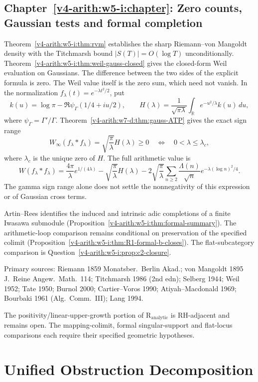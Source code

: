 \subsection{Chapter~\ref{v4-arith:w5-i:chapter}: Zero counts, Gaussian tests and formal completion}
\label{v4-arith:w5-synth:ch59}

Theorem~\ref{v4-arith:w5-i:thm:rvm} establishes
the sharp Riemann--von Mangoldt density with the Titchmarsh bound
\(|S(T)|=O(\log T)\) unconditionally.
Theorem~\ref{v4-arith:w5-i:thm:weil-gauss-closed}
gives the closed-form Weil evaluation on Gaussians.
The difference between the two sides of the explicit formula is zero.
The Weil value itself is the zero sum, which need not vanish.
In the normalization \(f_\lambda(t)=e^{-\lambda t^2/2}\), put
\[
 k(u)=\log\pi-\Re\psi_\Gamma(1/4+iu/2),\qquad
 H(\lambda)=\frac1{\sqrt{\pi\lambda}}
             \int_{\mathbb R}e^{-u^2/\lambda}k(u)\,du,
\]
where \(\psi_\Gamma=\Gamma'/\Gamma\).
Theorem~\ref{v4-arith:w7-d:thm:gauss-ATP} gives the exact sign range
\[
 W_\infty(f_\lambda*f_\lambda)
 =\sqrt{\frac\pi\lambda}H(\lambda)\ge0
 \quad\Longleftrightarrow\quad 0<\lambda\le\lambda_c,
\]
where \(\lambda_c\) is the unique zero of \(H\).
The full arithmetic value is
\[
 W(f_\lambda*f_\lambda)
 =\frac{4\pi}{\lambda}e^{1/(4\lambda)}
  -\sqrt{\frac\pi\lambda}H(\lambda)
  -2\sqrt{\frac\pi\lambda}\sum_{n\ge2}
     \frac{\Lambda(n)}{\sqrt n}e^{-\lambda(\log n)^2/4}.
\]
The gamma sign range alone does not settle the nonnegativity of this
expression or of Gaussian cross terms.

Artin--Rees identifies the induced and intrinsic adic completions
of a finite Iwasawa submodule
(Proposition~\ref{v4-arith:w5-i:thm:formal-summary}).
The arithmetic-loop comparison remains conditional on preservation
of the specified colimit
(Proposition~\ref{v4-arith:w5-i:thm:R1-formal-b-closes}).
The flat-subcategory comparison is
Question~\ref{v4-arith:w5-i:prop:c2-closure}.

Primary sources: Riemann 1859 Monatsber.~Berlin Akad.;
von Mangoldt 1895 J.~Reine Angew.~Math.~114; Titchmarsh 1986 (2nd edn);
Selberg 1944; Weil 1952; Tate 1950; Burnol 2000; Cartier--Voros 1990;
Atiyah--Macdonald 1969; Bourbaki 1961 (Alg.~Comm.~III); Lang 1994.

The positivity/linear-upper-growth portion of
\(\mathrm{R}_{\mathrm{analytic}}\) is RH-adjacent and remains open.
The mapping-colimit, formal singular-support and flat-locus
comparisons each require their specified geometric hypotheses.

\section{Unified Obstruction Decomposition}
\label{v4-arith:w5-synth:unified-table}


